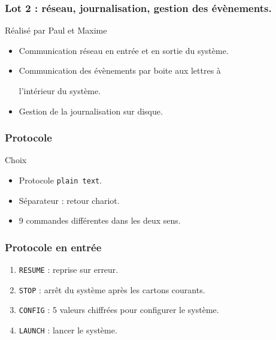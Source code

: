 \documentclass{beamer}
\begin{document}
	\begin{frame}

	\frametitle{Lot 2 : réseau, journalisation, gestion des évènements.}

	    \begin{block}{Réalisé par Paul et Maxime}

	  \begin{itemize}

	      \item   Communication réseau en entrée et en sortie du système.

	      \item   Communication des évènements par boite aux lettres à

	      l'intérieur du système.

	      \item   Gestion de la journalisation sur disque.

	  \end{itemize}

	    \end{block}

	\end{frame}

	

	\begin{frame}

	\frametitle{Protocole}

	    \begin{block}{Choix}

	  \begin{itemize}

	      \item Protocole \texttt{plain text}.

	      \item Séparateur : retour chariot.

	      \item 9 commandes différentes dans les deux sens.

	  \end{itemize}

	    \end{block}

	\end{frame}

	

	\begin{frame}

	\frametitle{Protocole en entrée}

	\begin{enumerate}

	    \item \texttt{RESUME} : reprise sur erreur.

	    \item \texttt{STOP} : arrêt du système après les cartons courants.

	    \item \texttt{CONFIG} : 5 valeurs chiffrées pour configurer le système.

	    \item \texttt{LAUNCH} : lancer le système.

	\end{enumerate}

	\end{frame}
\end{document}
